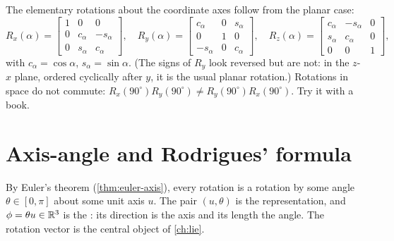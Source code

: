 The elementary rotations about the coordinate axes follow from the planar case:
\begin{equation}
  R_x(\alpha) = \begin{bmatrix} 1 & 0 & 0 \\ 0 & c_\alpha & -s_\alpha \\ 0 & s_\alpha & c_\alpha \end{bmatrix},\quad
  R_y(\alpha) = \begin{bmatrix} c_\alpha & 0 & s_\alpha \\ 0 & 1 & 0 \\ -s_\alpha & 0 & c_\alpha \end{bmatrix},\quad
  R_z(\alpha) = \begin{bmatrix} c_\alpha & -s_\alpha & 0 \\ s_\alpha & c_\alpha & 0 \\ 0 & 0 & 1 \end{bmatrix},
\end{equation}
with $c_\alpha = \cos\alpha$, $s_\alpha = \sin\alpha$. (The signs of $R_y$ look reversed but are not: in the $z$-$x$ plane, ordered cyclically
after $y$, it is the usual planar rotation.) Rotations in space do not commute: $R_x(90^\circ)R_y(90^\circ) \ne R_y(90^\circ)R_x(90^\circ)$. Try it
with a book.

\section{Axis-angle and Rodrigues' formula}

By Euler's theorem (\cref{thm:euler-axis}), every rotation is a rotation by some angle $\theta \in [0, \pi]$ about some unit axis $u$. The pair
$(u, \theta)$ is the  representation, and $\phi = \theta u \in \mathbb{R}^3$ is the : its direction is the axis and its
length the angle. The rotation vector is the central object of \cref{ch:lie}.

